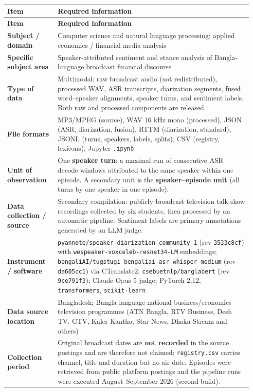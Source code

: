 \documentclass[11pt,a4paper]{article}
\newcommand{\thd}[1]{\textbf{\sffamily\small #1}}          %
\begin{document}
\begin{longtable}{|L{4.0cm}|L{11.4cm}|}
\hline
\thd{Item} & \thd{Required information} \\ \hline
\endfirsthead
\hline \thd{Item} & \thd{Required information} \\ \hline \endhead
\thd{Subject / domain}          & Computer science and natural language processing; applied economics / financial media analysis \\ \hline
\thd{Specific subject area}     & Speaker-attributed sentiment and stance analysis of Bangla-language broadcast financial discourse \\ \hline
\thd{Type of data}              & Multimodal: raw broadcast audio (not redistributed), processed WAV, ASR transcripts, diarization segments, fused word--speaker alignments, speaker turns, and sentiment labels. Both raw and processed components are released. \\ \hline
\thd{File formats}              & MP3/MPEG (source), WAV 16 kHz mono (processed), JSON (ASR, diarization, fusion), RTTM (diarization, standard), JSONL (turns, speakers, labels, splits), CSV (registry, lexicons), Jupyter \texttt{.ipynb} \\ \hline
\thd{Unit of observation}       & One \textbf{speaker turn}: a maximal run of consecutive ASR decode windows attributed to the same speaker within one episode. A secondary unit is the \textbf{speaker--episode unit} (all turns by one speaker in one episode). \\ \hline
\thd{Data collection / source}  & Secondary compilation: publicly broadcast television talk-show recordings collected by six students, then processed by an automatic pipeline. Sentiment labels are primary annotations generated by an LLM judge. \\ \hline
\thd{Instrument / software}     & \texttt{pyannote/speaker-diarization-community-1} (rev \texttt{3533c8cf}) with \texttt{wespeaker-voxceleb-resnet34-LM} embeddings; \texttt{bengaliAI/tugstugi\_bengaliai-asr\_whisper-medium} (rev \texttt{da605cc1}) via CTranslate2; \texttt{csebuetnlp/banglabert} (rev \texttt{9ce791f3}); Claude Opus 5 judge; PyTorch 2.12, \texttt{transformers}, \texttt{scikit-learn} \\ \hline
\thd{Data source location}      & Bangladesh; Bangla-language national business/economics television programmes (ATN Bangla, RTV Business, Desh TV, GTV, Kaler Kantho, Star News, Dhaka Stream and others) \\ \hline
\thd{Collection period}         & Original broadcast dates are \textbf{not recorded} in the source postings and are therefore not claimed; \texttt{registry.csv} carries channel, title and duration but no air date. Episodes were retrieved from public platform postings and the pipeline runs were executed August--September 2026 (second build). \\ \hline

\end{longtable}
\end{document}
